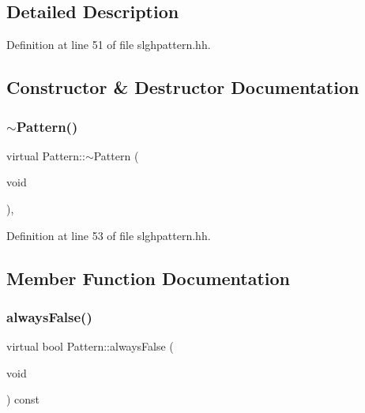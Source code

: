 \subsection{Detailed Description}


Definition at line 51 of file slghpattern.\+hh.



\subsection{Constructor \& Destructor Documentation}
\mbox{\label{class_pattern_a5265f23b626aef409247e32b874ba308}} 
\subsubsection{\texorpdfstring{$\sim$Pattern()}{~Pattern()}}
{\footnotesize\ttfamily virtual Pattern\+::$\sim$\+Pattern (\begin{DoxyParamCaption}\item[{void}]{ }\end{DoxyParamCaption})\hspace{0.3cm}{\ttfamily [inline]}, {\ttfamily [virtual]}}



Definition at line 53 of file slghpattern.\+hh.



\subsection{Member Function Documentation}
\mbox{\label{class_pattern_ab7e66817fda44ad29954c8cfcb9c9266}} 
\subsubsection{\texorpdfstring{alwaysFalse()}{alwaysFalse()}}
{\footnotesize\ttfamily virtual bool Pattern\+::always\+False (\begin{DoxyParamCaption}\item[{void}]{ }\end{DoxyParamCaption}) const\hspace{0.3cm}{\ttfamily [pure virtual]}}



